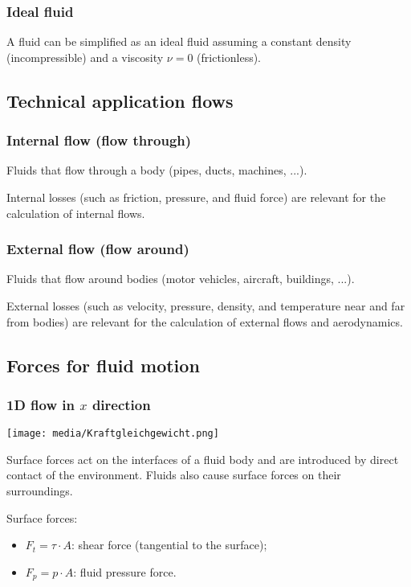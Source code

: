 \documentclass{article}
\begin{document}
\subsubsection{Ideal fluid}
A fluid can be simplified as an ideal fluid assuming a constant density
(incompressible) and a viscosity $\nu = 0$ (frictionless).

\newpage
\subsection{Technical application flows}
\subsubsection{Internal flow (flow through)}
Fluids that flow through a body (pipes, ducts, machines, ...).

Internal losses (such as friction, pressure, and fluid force) are relevant for the calculation of internal flows.

\subsubsection{External flow (flow around)}
Fluids that flow around bodies (motor vehicles, aircraft, buildings, ...).

External losses (such as velocity, pressure, density, and temperature
near and far from bodies) are relevant for the calculation of external flows
and aerodynamics.

\subsection{Forces for fluid motion}
\subsubsection{1D flow in $x$ direction}
\begin{center}
    \texttt{[image: media/Kraftgleichgewicht.png]}
\end{center}

Surface forces act on the interfaces of a fluid body and are introduced by
direct contact of the environment. Fluids also cause surface forces on
their surroundings.

Surface forces:
\begin{itemize}
    \item $F_t = \tau\cdot A$: shear force (tangential to the surface);
    \item $F_p = p\cdot A$: fluid pressure force.
\end{itemize}
\end{document}

